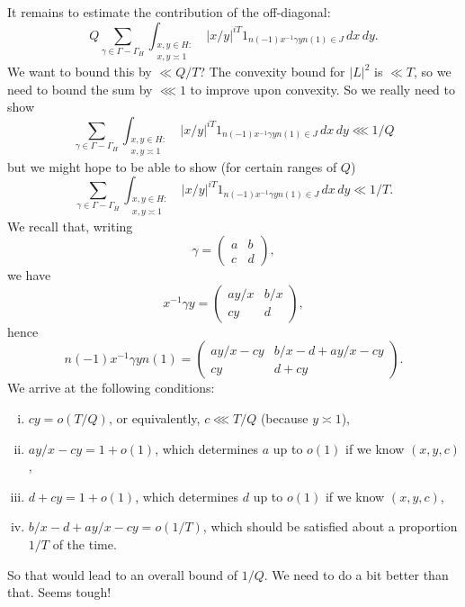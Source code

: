 \documentclass[reqno]{amsart} 
\begin{document}
It remains to estimate the contribution of the off-diagonal:
\begin{equation*}
  Q
  \sum _{\gamma \in \Gamma - \Gamma_H}
  \int _{
    \substack{
      x, y \in H :  \\
       x, y \asymp 1
    }
  }
  \lvert x / y \rvert^{i T}
  1 _{n (- 1 ) x ^{-1} \gamma y n (1) \in J} \, d x \, d y.
\end{equation*}
We want to bound this by $\ll Q/T$?  The convexity bound for $\lvert L \rvert^2$ is $\ll T$, so we need to bound the sum by $\lll 1$ to improve upon convexity.  So we really need to show
\begin{equation*}
  \sum _{\gamma \in \Gamma - \Gamma_H}
  \int _{
    \substack{
      x, y \in H :  \\
       x, y \asymp 1
    }
  }
  \lvert x / y \rvert^{i T}
  1 _{n (- 1 ) x ^{-1} \gamma y n (1) \in J} \, d x \, d y \lll 1/Q
\end{equation*}
but we might hope to be able to show (for certain ranges of $Q$)
\begin{equation*}
  \sum _{\gamma \in \Gamma - \Gamma_H}
  \int _{
    \substack{
      x, y \in H :  \\
       x, y \asymp 1
    }
  }
  \lvert x / y \rvert^{i T}
  1 _{n (- 1 ) x ^{-1} \gamma y n (1) \in J} \, d x \, d y \ll 1/T.
\end{equation*}
We recall that, writing
\begin{equation*}
  \gamma =
  \begin{pmatrix}
    a & b \\
    c & d
  \end{pmatrix},
\end{equation*}
we have
\begin{equation*}
  x ^{-1} \gamma y =
  \begin{pmatrix}
    a y/x & b/x \\
    c y & d
  \end{pmatrix},
\end{equation*}
hence
\begin{equation*}
  n (-1) x ^{-1} \gamma y n (1)
  =
  \begin{pmatrix}
    a y/x - c y & b/x - d + a y / x - c y \\
    c y & d + c y
  \end{pmatrix}.
\end{equation*}
We arrive at the following conditions:
\begin{enumerate}[(i)]
\item\label{enumerate:20230522174144} $c y = o(T/Q)$, or equivalently, $c  \lll T/Q$ (because $y \asymp 1$),
\item\label{enumerate:20230522174157} $ay / x - c y = 1 + o(1)$, which determines $a$ up to $o(1)$ if we know $(x,y,c)$,
\item\label{enumerate:20230522174208} $d + c y = 1 + o(1)$, which determines $d$ up to $o(1)$ if we know $(x,y,c)$,
\item $b /x - d + a y / x - c y = o(1/T)$, which should be satisfied about a proportion $1/T$ of the time.
\end{enumerate}
So that would lead to an overall bound of $1 / Q$.  We need to do a bit better than that.  Seems tough!



{} 
\end{document}
